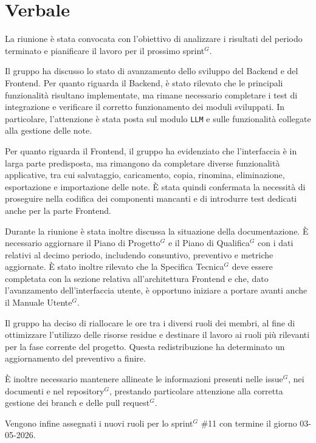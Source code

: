 \documentclass[a4paper,10pt]{article}
\begin{document}
\section*{Verbale}

La riunione è stata convocata con l'obiettivo di analizzare i risultati del periodo terminato e pianificare il lavoro per il prossimo sprint$^G$.

Il gruppo ha discusso lo stato di avanzamento dello sviluppo del Backend e del Frontend. Per quanto riguarda il Backend, è stato rilevato che le principali funzionalità risultano implementate, ma rimane necessario completare i test di integrazione e verificare il corretto funzionamento dei moduli sviluppati. In particolare, l'attenzione è stata posta sul modulo \texttt{LLM} e sulle funzionalità collegate alla gestione delle note.

Per quanto riguarda il Frontend, il gruppo ha evidenziato che l'interfaccia è in larga parte predisposta, ma rimangono da completare diverse funzionalità applicative, tra cui salvataggio, caricamento, copia, rinomina, eliminazione, esportazione e importazione delle note. È stata quindi confermata la necessità di proseguire nella codifica dei componenti mancanti e di introdurre test dedicati anche per la parte Frontend.

Durante la riunione è stata inoltre discussa la situazione della documentazione. È necessario aggiornare il Piano di Progetto$^G$ e il Piano di Qualifica$^G$ con i dati relativi al decimo periodo, includendo consuntivo, preventivo e metriche aggiornate. È stato inoltre rilevato che la Specifica Tecnica$^G$ deve essere completata con la sezione relativa all'architettura Frontend e che, dato l'avanzamento dell'interfaccia utente, è opportuno iniziare a portare avanti anche il Manuale Utente$^G$.

Il gruppo ha deciso di riallocare le ore tra i diversi ruoli dei membri, al fine di ottimizzare l'utilizzo delle risorse residue e destinare il lavoro ai ruoli più rilevanti per la fase corrente del progetto. Questa redistribuzione ha determinato un aggiornamento del preventivo a finire.

È inoltre necessario mantenere allineate le informazioni presenti nelle issue$^G$, nei documenti e nel repository$^G$, prestando particolare attenzione alla corretta gestione dei branch e delle pull request$^G$.

Vengono infine assegnati i nuovi ruoli per lo sprint$^G$ \#11 con termine il giorno 03-05-2026.
\end{document}
